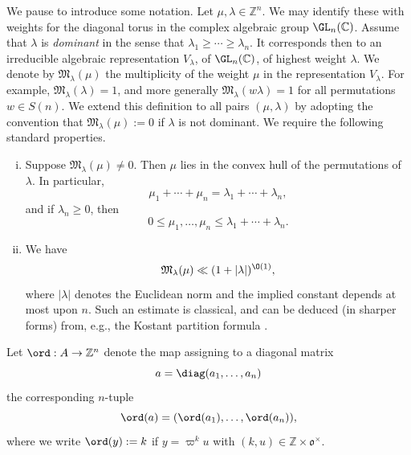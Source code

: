 We pause to introduce some notation.  Let $\mu, \lambda \in \mathbb{Z}^n$.  We may identify these with weights for the diagonal torus in the complex algebraic group $\GL_n(\mathbb{C})$.  Assume that $\lambda$ is \emph{dominant} in the sense that $\lambda_1 \geq \dotsb \geq \lambda_n$.  It corresponds then to an irreducible algebraic representation $V_\lambda$, of $\GL_n(\mathbb{C})$, of highest weight $\lambda$.  We denote by $\mathfrak{M}_{\lambda}(\mu)$ the multiplicity of the weight $\mu$ in the representation $V_\lambda$.  For example, $\mathfrak{M}_{\lambda}(\lambda) = 1$, and more generally $\mathfrak{M}_{\lambda}(w \lambda) = 1$ for all permutations $w \in S(n)$.  We extend this definition to all pairs $(\mu,\lambda)$ by adopting the convention that $\mathfrak{M}_{\lambda}(\mu) := 0$ if $\lambda$ is not dominant.  We require the following standard properties.
\begin{enumerate}[(i)]
\item Suppose $\mathfrak{M}_{\lambda}(\mu) \neq 0$.  Then $\mu$ lies in the convex hull of the permutations of $\lambda$.  In particular,
  \begin{equation}\label{eq:mu_1-+-dotsb}
    \mu_1 + \dotsb + \mu_n = \lambda_1 + \dotsb + \lambda_n,
  \end{equation}
  and if $\lambda_n \geq 0$, then
  \begin{equation}\label{eq:0-leq-mu_1}
    0 \leq \mu_1,\dotsc,\mu_n \leq \lambda_1 + \dotsb + \lambda_n.
  \end{equation}
\item We have
  \begin{equation}\label{eq:mathfr-ll-1}
    \mathfrak{M}_{\lambda}(\mu) \ll (1 + |\lambda|)^{\O(1)},
  \end{equation}
  where $|\lambda|$ denotes the Euclidean norm and the implied constant depends at most upon $n$.  Such an estimate is classical, and can be deduced (in sharper forms) from, e.g., the Kostant partition formula \cite[p258, Theorem IV.3.2]{MR1410059}.
\end{enumerate}

Let $\ord : A \rightarrow \mathbb{Z}^n$ denote the map assigning to a diagonal matrix
\begin{equation*}
  a = \diag(a_1,\dotsc,a_n)
\end{equation*}
the corresponding $n$-tuple
\begin{equation*}
  \ord(a) = (\ord(a_1),\dotsc,\ord(a_n)),
\end{equation*}
where we write $\ord(y) := k$ if $y = \varpi^{k} u$ with $(k, u) \in \mathbb{Z} \times \mathfrak{o}^\times$.

